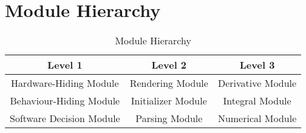 \documentclass[12pt, titlepage]{article}
\begin{document}
\section{Module Hierarchy}
\begin{table}[h!]
\caption{Module Hierarchy}
\begin{center}
\begin{tabular}{|c|c|c|}
\hline
\textbf{Level 1} & \textbf{Level 2} & \textbf{Level 3}\\
\hline
Hardware-Hiding Module & Rendering Module & Derivative Module\\
\hline
Behaviour-Hiding Module & Initializer Module & Integral Module\\
\hline
Software Decision Module & Parsing Module & Numerical Module\\
\hline
\end{tabular}
\end{center}
\label{default}
\end{table}%
\end{document}
